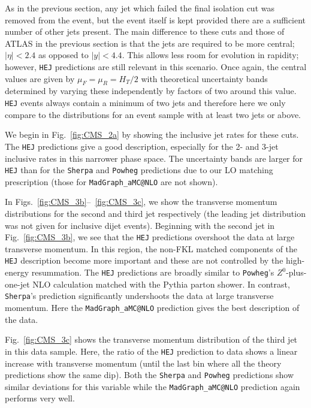 		As in the previous section, any jet which failed the final isolation cut was
		removed from the event, but the event itself is kept provided there are a
		sufficient number of other jets present.  The main difference to these cuts and
		those of ATLAS in the previous section is that the jets are required to be more
		central; $|\eta|<2.4$ as opposed to $|y|<4.4$.  This allows less room for
		evolution in rapidity; however, \texttt{HEJ} predictions are still relevant in this
		scenario.  Once again, the central values are given by $\mu_F=\mu_R=H_T/2$ with
		theoretical uncertainty bands determined by varying these independently by
		factors of two around this value.  \texttt{HEJ} events always contain a minimum of two
		jets and therefore here we only compare to the distributions for an event sample
		with at least two jets or above.

		We begin in Fig.~\eqref{fig:CMS_2a} by showing the inclusive jet rates for these
		cuts.  The \texttt{HEJ} predictions give a good description, especially for the 2- and
		3-jet inclusive rates in this narrower phase space. The uncertainty bands are
		larger for \texttt{HEJ} than for the \texttt{Sherpa} and \texttt{Powheg} predictions
		due to our LO matching prescription (those for \texttt{MadGraph\_aMC@NLO} are not shown).

		In Figs.~\eqref{fig:CMS_3b}--~\eqref{fig:CMS_3c}, we show the transverse momentum
		distributions for the second and third jet respectively (the leading jet
		distribution was not given for inclusive dijet events).  Beginning with the
		second jet in Fig.~\eqref{fig:CMS_3b}, we see that the \texttt{HEJ} predictions overshoot
		the data at large transverse momentum.  In this region, the non-FKL matched
		components of the \texttt{HEJ} description become more important and these are not
		controlled by the high-energy resummation.  The \texttt{HEJ} predictions are broadly
		similar to \texttt{Powheg}'s $Z^0$-plus-one-jet NLO calculation matched with the Pythia
		parton shower.  In contrast, \texttt{Sherpa}'s prediction significantly undershoots the
		data at large transverse momentum.  Here the \texttt{MadGraph\_aMC@NLO} prediction gives the best
		description of the data.

		Fig.~\eqref{fig:CMS_3c} shows the transverse momentum distribution of the third
		jet in this data sample.  Here, the ratio of the \texttt{HEJ} prediction to data shows a
		linear increase with transverse momentum (until the last bin where all the
		theory predictions show the same dip).  Both the \texttt{Sherpa} and \texttt{Powheg} predictions
		show similar deviations for this variable while the \texttt{MadGraph\_aMC@NLO} prediction again
		performs very well.

